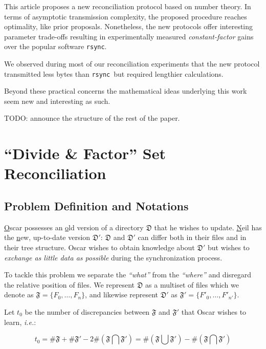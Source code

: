 \documentclass[11pt]{llncs}
\newcommand{\rsync}{\texttt{rsync}\xspace}
\begin{document}
This article proposes a new reconciliation protocol based on number theory. In
terms of asymptotic  transmission complexity, the proposed procedure reaches
optimality, like prior proposals. Nonetheless, the new protocols offer interesting parameter trade-offs resulting in experimentally measured {\sl constant-factor} gains over the popular software \rsync.\smallskip

We observed during most of our reconciliation experiments that the new protocol transmitted less bytes than \rsync\ but required lengthier calculations.\smallskip

Beyond these practical concerns the mathematical ideas underlying this work seem new and interesting as such.

TODO: announce the structure of the rest of the paper.

\section{``Divide \& Factor'' Set Reconciliation}

\subsection{Problem Definition and Notations}

\underline{O}scar possesses an \underline{o}ld version of a directory
$\mathfrak{D}$ that he wishes to update. \underline{N}eil has the
\underline{n}ew, up-to-date version $\mathfrak{D}'$: $\mathfrak{D}$ and
$\mathfrak{D}'$ can differ both in their files and in their tree structure.
Oscar wishes to obtain knowledge about $\mathfrak{D}'$ but wishes to {\sl
exchange as little data as possible} during the synchronization
process.\smallskip

To tackle this problem we separate the {\sl ``what''} from the {\sl ``where''}
and disregard the relative position of files. We represent $\mathfrak{D}$ as a
multiset of files which we denote as $\mathfrak{F}=\{F_0,\ldots,F_{n}\}$, and
likewise represent $\mathfrak{D'}$ as
$\mathfrak{F}'=\{F'_0,\ldots,F'_{n'}\}$.\smallskip

Let $t_0$ be the number of discrepancies between $\mathfrak{F}$ and $\mathfrak{F}'$ that Oscar wishes to learn, {\sl i.e.}:

$$t_0=\#\mathfrak{F}+\#\mathfrak{F}'-2 \#\left(\mathfrak{F} \bigcap \mathfrak{F}'\right)=\#\left(\mathfrak{F}\bigcup\mathfrak{F}'\right)-\#\left(\mathfrak{F}\bigcap\mathfrak{F}'\right)$$
\end{document}
